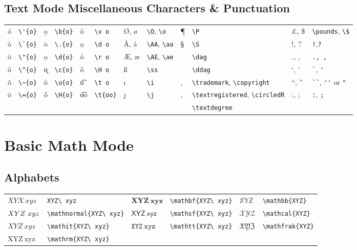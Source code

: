 \documentclass[10pt, english]{article}
\begin{document}
	\subsection{Text Mode Miscellaneous Characters \& Punctuation}

	\begin{center}
		\scriptsize
	\begin{tabular}{ll|ll|ll|ll|ll|ll}
		\'{o} & \verb|\'{o}| & \b{o} & \verb|\b{o}| & \v o & \verb|\v o| & \O, \o & \verb|\O|, \verb|\o| & \P & \verb|\P| & \pounds, \$ & \verb|\pounds|, \verb|\$| \\
		\`{o} & \verb|\`{o}| & \.{o} & \verb|\.{o}| & \d o & \verb|\d o| & \AA, \aa & \verb|\AA|, \verb|\aa| & \S & \verb|\S| & !, ? & \verb|!|,\verb|?| \\
		\"{o} & \verb|\"{o}| & \d{o} & \verb|\d{o}| & \r o & \verb|\r o| & \AE, \ae & \verb|\AE|, \verb|\ae| & \dag & \verb|\dag| & ., , & \verb|., ,| \\
		\^{o} & \verb|\^{o}| & \c{o} & \verb|\c{o}| & \H o & \verb|\H o| & \ss & \verb|\ss| & \ddag & \verb|\ddag| & `, ' & \verb|`|, \verb|'| \\
		\~{o} & \verb|\~{o}| & \u{o} & \verb|\u{o}| & \t o & \verb|\t o| & \i & \verb|\i| & \texttrademark, \textcopyright & \verb|\trademark|, \verb|\copyright| & ``, '' & \verb|``|, \verb|''| or \verb|"| \\
		\={o} & \verb|\={o}| & \H{o} & \verb|\H{o}| & \t{oo} & \verb|\t{oo}| & \j & \verb|\j| & \textregistered, \circledR & \verb|\textregistered|, \verb|\circledR| & :, ; & \verb|:|, \verb|;| \\
		& & & & & & & & \textdegree & \verb|\textdegree|\\
	\end{tabular}
	\end{center}

\section{Basic Math Mode}

	\subsection{Alphabets}

	\begin{center}
		\scriptsize
	\begin{tabular}{ll|ll|ll}
		$XYX\ xyz$ & \verb|XYZ\ xyz| & $\mathbf{XYZ\ xyz}$ & \verb|\mathbf{XYZ\ xyz}| & $\mathbb{XYZ}$ & \verb|\mathbb{XYZ}| \\ 
		$\mathnormal{XYZ\ xyz}$ & \verb|\mathnormal{XYZ\ xyz}| & $\mathsf{XYZ\ xyz}$ & \verb|\mathsf{XYZ\ xyz}| & $\mathcal{XYZ}$ & \verb|\mathcal{XYZ}| \\
		$\mathit{XYZ\ xyz}$ & \verb|\mathit{XYZ\ xyz}| & $\mathtt{XYZ\ xyz}$ & \verb|\mathtt{XYZ\ xyz}| & $\mathfrak{XYZ}$ & \verb|\mathfrak{XYZ}| \\
		$\mathrm{XYZ\ xyz}$ & \verb|\mathrm{XYZ\ xyz}| & 
	\end{tabular}
	\end{center}
\end{document}
